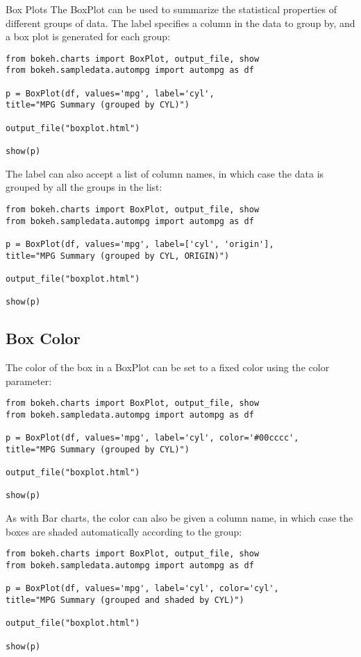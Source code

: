 
Box Plots
The BoxPlot can be used to summarize the statistical properties of different groups of data. The label specifies a column in the data to group by, and a box plot is generated for each group:
\begin{framed}
	\begin{verbatim}
from bokeh.charts import BoxPlot, output_file, show
from bokeh.sampledata.autompg import autompg as df

p = BoxPlot(df, values='mpg', label='cyl',
title="MPG Summary (grouped by CYL)")

output_file("boxplot.html")

show(p)
\end{verbatim}
\end{framed}
The label can also accept a list of column names, in which case the data is grouped by all the groups in the list:
\begin{framed}
	\begin{verbatim}
from bokeh.charts import BoxPlot, output_file, show
from bokeh.sampledata.autompg import autompg as df

p = BoxPlot(df, values='mpg', label=['cyl', 'origin'],
title="MPG Summary (grouped by CYL, ORIGIN)")

output_file("boxplot.html")

show(p)
\end{verbatim}
\end{framed}
\subsection{Box Color}
The color of the box in a BoxPlot can be set to a fixed color using the color parameter:

\begin{framed}
	\begin{verbatim}
from bokeh.charts import BoxPlot, output_file, show
from bokeh.sampledata.autompg import autompg as df

p = BoxPlot(df, values='mpg', label='cyl', color='#00cccc',
title="MPG Summary (grouped by CYL)")

output_file("boxplot.html")

show(p)
\end{verbatim}
\end{framed}
As with Bar charts, the color can also be given a column name, in which case the boxes are shaded automatically according to the group:
\begin{framed}
	\begin{verbatim}
from bokeh.charts import BoxPlot, output_file, show
from bokeh.sampledata.autompg import autompg as df

p = BoxPlot(df, values='mpg', label='cyl', color='cyl',
title="MPG Summary (grouped and shaded by CYL)")

output_file("boxplot.html")

show(p)
\end{verbatim}
\end{framed}
